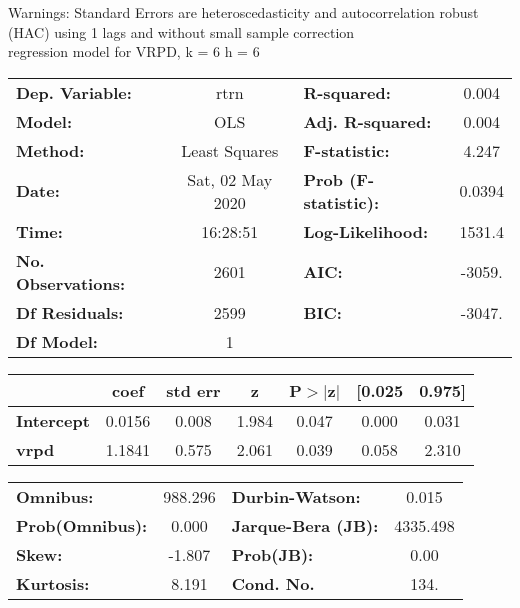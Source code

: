 Warnings: \newline
 [1] Standard Errors are heteroscedasticity and autocorrelation robust (HAC) using 1 lags and without small sample correction\\ 

regression model for VRPD, k = 6 h = 6\begin{center}
\begin{tabular}{lclc}
\toprule
\textbf{Dep. Variable:}    &       rtrn       & \textbf{  R-squared:         } &     0.004   \\
\textbf{Model:}            &       OLS        & \textbf{  Adj. R-squared:    } &     0.004   \\
\textbf{Method:}           &  Least Squares   & \textbf{  F-statistic:       } &     4.247   \\
\textbf{Date:}             & Sat, 02 May 2020 & \textbf{  Prob (F-statistic):} &   0.0394    \\
\textbf{Time:}             &     16:28:51     & \textbf{  Log-Likelihood:    } &    1531.4   \\
\textbf{No. Observations:} &        2601      & \textbf{  AIC:               } &    -3059.   \\
\textbf{Df Residuals:}     &        2599      & \textbf{  BIC:               } &    -3047.   \\
\textbf{Df Model:}         &           1      & \textbf{                     } &             \\
\bottomrule
\end{tabular}
\begin{tabular}{lcccccc}
                   & \textbf{coef} & \textbf{std err} & \textbf{z} & \textbf{P$> |$z$|$} & \textbf{[0.025} & \textbf{0.975]}  \\
\midrule
\textbf{Intercept} &       0.0156  &        0.008     &     1.984  &         0.047        &        0.000    &        0.031     \\
\textbf{vrpd}      &       1.1841  &        0.575     &     2.061  &         0.039        &        0.058    &        2.310     \\
\bottomrule
\end{tabular}
\begin{tabular}{lclc}
\textbf{Omnibus:}       & 988.296 & \textbf{  Durbin-Watson:     } &    0.015  \\
\textbf{Prob(Omnibus):} &   0.000 & \textbf{  Jarque-Bera (JB):  } & 4335.498  \\
\textbf{Skew:}          &  -1.807 & \textbf{  Prob(JB):          } &     0.00  \\
\textbf{Kurtosis:}      &   8.191 & \textbf{  Cond. No.          } &     134.  \\
\bottomrule
\end{tabular}
\end{center}

